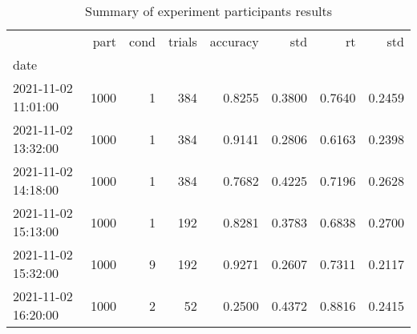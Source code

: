 \begin{table}
\centering
\caption{Summary of experiment participants results}
\label{table-subject-summary}
\begin{tabular}{lrrrrrrr}
\toprule
{} &  part & cond & trials & accuracy &    std &     rt &    std \\
date                &       &      &        &          &        &        &        \\
\midrule
2021-11-02 11:01:00 &  1000 &    1 &    384 &   0.8255 & 0.3800 & 0.7640 & 0.2459 \\
2021-11-02 13:32:00 &  1000 &    1 &    384 &   0.9141 & 0.2806 & 0.6163 & 0.2398 \\
2021-11-02 14:18:00 &  1000 &    1 &    384 &   0.7682 & 0.4225 & 0.7196 & 0.2628 \\
2021-11-02 15:13:00 &  1000 &    1 &    192 &   0.8281 & 0.3783 & 0.6838 & 0.2700 \\
2021-11-02 15:32:00 &  1000 &    9 &    192 &   0.9271 & 0.2607 & 0.7311 & 0.2117 \\
2021-11-02 16:20:00 &  1000 &    2 &     52 &   0.2500 & 0.4372 & 0.8816 & 0.2415 \\
\bottomrule
\end{tabular}
\end{table}
